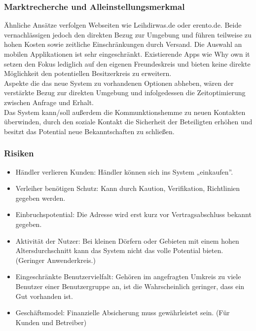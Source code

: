 \subsubsection{Marktrecherche und Alleinstellungsmerkmal}
Ähnliche Ansätze verfolgen Webseiten wie Leihdirwas.de oder erento.de. Beide vernachlässigen jedoch den direkten Bezug zur Umgebung und führen teilweise zu hohen Kosten sowie zeitliche Einschränkungen  durch Versand. Die Auswahl an mobilen Applikationen ist sehr eingeschränkt. Existierende Apps wie Why own it setzen den Fokus lediglich auf den eigenen Freundeskreis und bieten keine direkte Möglichkeit den potentiellen Besitzerkreis zu erweitern.\\
Aspekte die das neue System zu vorhandenen Optionen abheben, wären der verstärkte Bezug zur direkten Umgebung und infolgedessen die Zeitoptimierung zwischen Anfrage und Erhalt.\\
Das System kann/soll außerdem die Kommunktionshemme zu neuen Kontakten überwinden, durch den soziale Kontakt die Sicherheit der Beteiligten  erhöhen und besitzt das Potential neue Bekanntschaften zu schließen.


\subsubsection{Risiken}
\begin{itemize}
   \item Händler verlieren Kunden: Händler können sich ins System „einkaufen”.
   \item Verleiher benötigen Schutz: Kann durch Kaution, Verifikation, Richtlinien gegeben werden.
   \item Einbruchspotential: Die Adresse wird erst kurz vor Vertragsabschluss bekannt gegeben.
   \item Aktivität der Nutzer: Bei kleinen Dörfern oder Gebieten mit einem hohen Altersdurchschnitt kann das System nicht das volle Potential bieten. (Geringer Anwenderkreis.)
   \item Eingeschränkte Benutzervielfalt: Gehören im angefragten Umkreis zu viele Benutzer einer Benutzergruppe an, ist die Wahrscheinlich geringer, dass ein Gut vorhanden ist.
   \item Geschäftsmodel: Finanzielle Absicherung muss gewährleistet sein. (Für Kunden und Betreiber)
\end{itemize}

